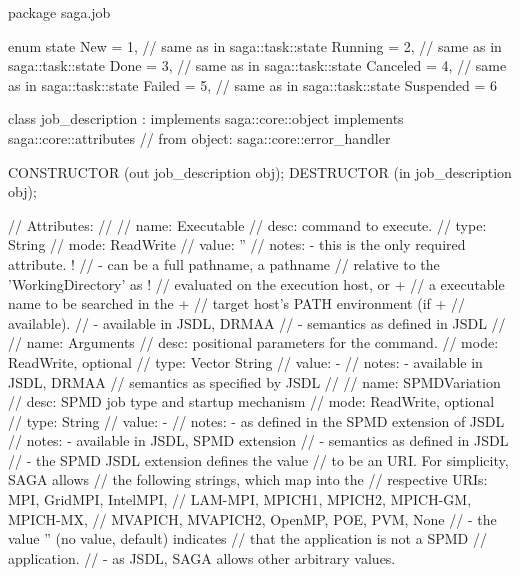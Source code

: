  \begin{myspec}
  package saga.job
  {
    enum state
    {
      New        =  1,  // same as in saga::task::state
      Running    =  2,  // same as in saga::task::state
      Done       =  3,  // same as in saga::task::state
      Canceled   =  4,  // same as in saga::task::state
      Failed     =  5,  // same as in saga::task::state
      Suspended  =  6
    }
 
 
    class job_description : implements   saga::core::object
                            implements   saga::core::attributes
                         // from object: saga::core::error_handler
    {
      CONSTRUCTOR          (out job_description obj);
      DESTRUCTOR           (in  job_description obj);
 
      // Attributes:
      //
      //   name:  Executable
      //   desc:  command to execute. 
      //   type:  String
      //   mode:  ReadWrite
      //   value: ''
      //   notes: - this is the only required attribute.  
!     //          - can be a full pathname, a pathname 
      //            relative to the 'WorkingDirectory' as 
!     //            evaluated on the execution host, or
+     //            a executable name to be searched in the
+     //            target host's PATH environment (if 
+     //            available).
      //          - available in JSDL, DRMAA
      //          - semantics as defined in JSDL
      //
      //   name:  Arguments
      //   desc:  positional parameters for the command. 
      //   mode:  ReadWrite, optional
      //   type:  Vector String
      //   value: -
      //   notes: - available in JSDL, DRMAA
      //            semantics as specified by JSDL
      // 
      //   name:  SPMDVariation
      //   desc:  SPMD job type and startup mechanism
      //   mode:  ReadWrite, optional
      //   type:  String
      //   value: -
      //   notes: - as defined in the SPMD extension of JSDL
      //   notes: - available in JSDL, SPMD extension
      //          - semantics as defined in JSDL
      //          - the SPMD JSDL extension defines the value
      //            to be an URI.  For simplicity, SAGA allows
      //            the following strings, which map into the 
      //            respective URIs: MPI, GridMPI, IntelMPI,
      //            LAM-MPI, MPICH1, MPICH2, MPICH-GM, MPICH-MX,
      //            MVAPICH, MVAPICH2, OpenMP, POE, PVM, None
      //          - the value '' (no value, default) indicates
      //            that the application is not a SPMD 
      //            application.
      //          - as JSDL, SAGA allows other arbitrary values.
}}
\end{myspec}
